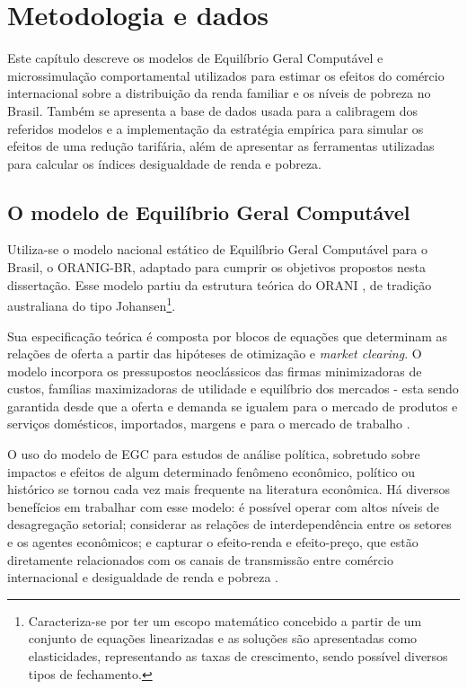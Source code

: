 

\chapter{Metodologia e dados} \label{cha:metodologia}

Este capítulo descreve os modelos de Equilíbrio Geral Computável e microssimulação comportamental utilizados para estimar os efeitos do comércio internacional sobre a distribuição da renda familiar e os níveis de pobreza no Brasil. Também se apresenta a base de dados usada para a calibragem dos referidos modelos e a implementação da estratégia empírica para simular os efeitos de uma redução tarifária, além de apresentar as ferramentas utilizadas para calcular os índices desigualdade de renda e pobreza.


\section{O modelo de Equilíbrio Geral Computável} \label{sec:egc}

Utiliza-se o modelo nacional estático de Equilíbrio Geral Computável para o Brasil, o ORANIG-BR, adaptado para cumprir os objetivos propostos nesta dissertação. Esse modelo partiu da estrutura teórica do ORANI \cite{dixit80}, de tradição australiana do tipo Johansen\footnote{Caracteriza-se por ter um escopo matemático concebido a partir de um conjunto de equações linearizadas e as soluções são apresentadas como elasticidades, representando as taxas de crescimento, sendo possível diversos tipos de fechamento.}.

Sua especificação teórica é composta por blocos de equações que determinam as relações de oferta a partir das hipóteses de otimização e \textit{market clearing}. O modelo incorpora os pressupostos neoclássicos das firmas minimizadoras de custos, famílias maximizadoras de utilidade e equilíbrio dos mercados - esta sendo garantida desde que a oferta e demanda se igualem para o mercado de produtos e serviços domésticos, importados, margens e para o mercado de trabalho \cite{dixit80}.

O uso do modelo de EGC para estudos de análise política, sobretudo sobre impactos e efeitos de algum determinado fenômeno econômico, político ou histórico se tornou cada vez mais frequente na literatura econômica. Há diversos benefícios em trabalhar com esse modelo: é possível operar com altos níveis de desagregação setorial; considerar as relações de interdependência entre os setores e os agentes econômicos; e capturar o efeito-renda e efeito-preço, que estão diretamente relacionados com os canais de transmissão entre comércio internacional e desigualdade de renda e pobreza \cite{anderson20}.

